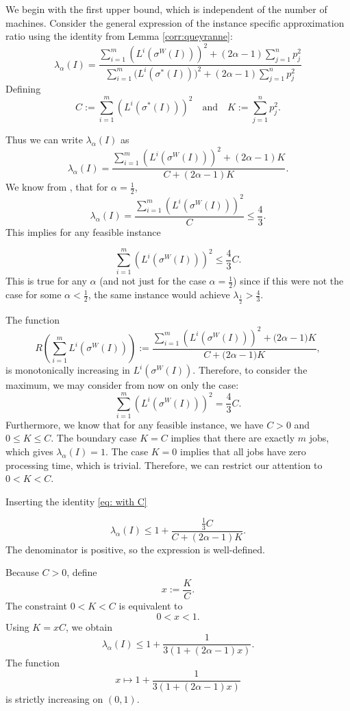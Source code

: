 \documentclass[%
english, titlepage=false %
]{./tum-templates/book/tumbook}
\begin{document}
We begin with the first upper bound, which is independent of the number of machines.
\newline
Consider the general expression of the instance specific approximation ratio using the identity from Lemma \ref{corr:queyranne}:
\[
    \lambda_{\alpha}(I)=\frac{\sum_{i=1}^{m} \left( L^{i}(\sigma^{W}(I)) \right)^2+(2\alpha-1)\sum_{j=1}^{n}p_{j}^{2}}
    {\sum_{i=1}^{m} \Big( L^{i}(\sigma^{*}(I)) \Big)^2+(2\alpha-1)\sum_{j=1}^{n}p_{j}^{2}}
\]
Defining
\[
    C:=\sum_{i=1}^{m} \left(L^{i}(\sigma^{*}(I))\right)^2 \quad \text{and} \quad K:=\sum_{j=1}^{n}p_{j}^{2}.
\]

Thus we can write $\lambda_{\alpha}(I)$ as
\[
    \lambda_{\alpha}(I)=\frac{\sum_{i=1}^{m} \left(L^{i}(\sigma^{W}(I))\right)^2+(2\alpha-1)K}{C+(2\alpha-1)K}.
\]
We know from , that for \(\alpha = \frac12\),
\[
\lambda_{\alpha}(I)
=
\frac{\sum_{i=1}^{m} \left(L^{i}(\sigma^{W}(I))\right)^2}{C}
\leq \frac43.
\]
This implies for any feasible instance

\begin{equation}
\label{eq: with C}
    \sum_{i=1}^{m} \left(L^{i}(\sigma^{W}(I))\right)^2
    \leq
    \frac43 C.
\end{equation}
This is true for any $\alpha$ (and not just for the case $\alpha=\frac12$) since if this were not the case 
for some $\alpha < \frac12$, the same instance  would achieve $\lambda_{\frac12} > \frac43$.

The function
 \[
    R\left(\sum_{i=1}^{m} L^{i}(\sigma^{W}(I))\right)
    :=
    \frac{\sum_{i=1}^{m}\left( L^{i}(\sigma^{W}(I))\right)^2 + \bigl(2\alpha-1\bigr)K}
         {C + \bigl(2\alpha-1\bigr)K},
\]
is monotonically increasing in $L^{i}(\sigma^{W}(I))$. Therefore, to consider the maximum, we may consider from now on only the case:
\[
    \sum_{i=1}^{m} \left(L^{i}(\sigma^{W}(I))\right)^2 = \frac43 C.
\]
Furthermore, we know that for any feasible instance, we have $C>0$ and $0 \le K \le C$. The
boundary case $K=C$ implies that there are exactly $m$ jobs, which gives $\lambda_{\alpha}(I) = 1$. The case
$K=0$ implies that all jobs have zero processing time, which is trivial.
Therefore, we can restrict our attention to $0<K<C$.

\noindent
Inserting the identity \eqref{eq: with C}

\[
    \lambda_{\alpha}(I) \le 1+\frac{\frac13 C}{C+(2\alpha-1)K}.
\]
The denominator is positive, so the expression is well-defined.


Because $C>0$, define
\[
    x:=\frac{K}{C}.
\]
The constraint $0<K<C$ is equivalent to
\[
    0<x<1.
\]
Using $K=xC$, we obtain
\[ 
    \lambda_{\alpha}(I) \le 1+\frac{1}{3(1+(2\alpha-1)x)}.
\]
The function
\[
    x\mapsto 1+\frac{1}{3(1+(2\alpha-1)x)}
\]
is strictly increasing on $(0,1)$.
\end{document}
